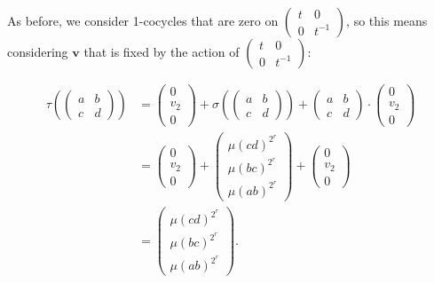 	As before, we consider 1-cocycles that are zero on $\left(\begin{matrix} t & 0 \\ 0 & t^{-1}\end{matrix}\right)$, so this means considering $\mathbf{v}$ that is fixed by the action of $\left(\begin{matrix} t & 0 \\ 0 & t^{-1}\end{matrix}\right)$:

	\begin{align*}
	\tau\left(
			\left(\begin{matrix} a & b \\ c & d\end{matrix}\right)
			\right) 
	&=
	\left(\begin{matrix} 0 \\ v_2 \\ 0 \end{matrix}\right) +
	\sigma\left(
			\left(\begin{matrix} a & b \\ c & d\end{matrix}\right)
			\right) 
	+\left(\begin{matrix} a & b \\ c & d\end{matrix}\right)\cdot \left(\begin{matrix} 0 \\ v_2 \\ 0 \end{matrix}\right) \\
		&=
		\left(\begin{matrix} 0 \\ v_2 \\ 0 \end{matrix}\right) +
\left(\begin{matrix} \mu(cd)^{2^r} \\ \mu(bc)^{2^r} \\ \mu(ab)^{2^r} \end{matrix}\right)
	+\left(\begin{matrix} 0 \\ v_2 \\ 0 \end{matrix}\right) \\
		&=\left(\begin{matrix}  \mu(cd)^{2^r} \\ \mu(bc)^{2^r} \\ \mu(ab)^{2^r} \end{matrix}\right).
		\end{align*}

